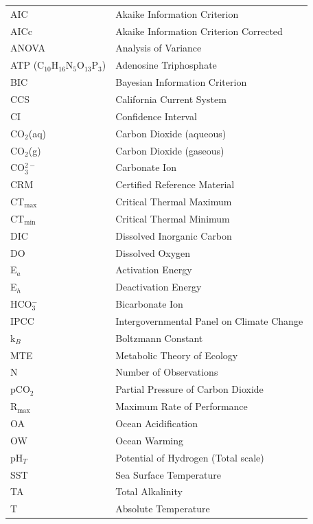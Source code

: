 \documentclass{CSUNthesis}
\begin{document}
\begin{spacing}{1}
\begin{center}
\begin{tabular}{@{}ll@{}}
AIC      & Akaike Information Criterion \\
AICc     & Akaike Information Criterion Corrected \\
ANOVA    & Analysis of Variance \\
ATP (C$_{10}$H$_{16}$N$_5$O$_{13}$P$_3$)       & Adenosine Triphosphate \\
BIC      & Bayesian Information Criterion \\
CCS      & California Current System \\
CI       & Confidence Interval \\
CO$_2$(aq) & Carbon Dioxide (aqueous) \\
CO$_2$(g)  & Carbon Dioxide (gaseous) \\
CO$_3^{2-}$ & Carbonate Ion \\
CRM      & Certified Reference Material \\
CT$_\mathrm{max}$ & Critical Thermal Maximum \\
CT$_\mathrm{min}$ & Critical Thermal Minimum \\
DIC      & Dissolved Inorganic Carbon \\
DO       & Dissolved Oxygen \\
E$_a$    & Activation Energy \\
E$_h$    & Deactivation Energy \\
HCO$_3^-$ & Bicarbonate Ion \\
IPCC     & Intergovernmental Panel on Climate Change \\
k$_B$    & Boltzmann Constant \\
MTE      & Metabolic Theory of Ecology \\
N        & Number of Observations \\
pCO$_2$  & Partial Pressure of Carbon Dioxide \\
R$_\mathrm{max}$ & Maximum Rate of Performance \\
OA       & Ocean Acidification \\
OW       & Ocean Warming \\
pH$_T$   & Potential of Hydrogen (Total scale) \\
SST      & Sea Surface Temperature \\
TA       & Total Alkalinity \\
T        & Absolute Temperature \\

\end{tabular}
\end{center}
\end{spacing}
\end{document}

